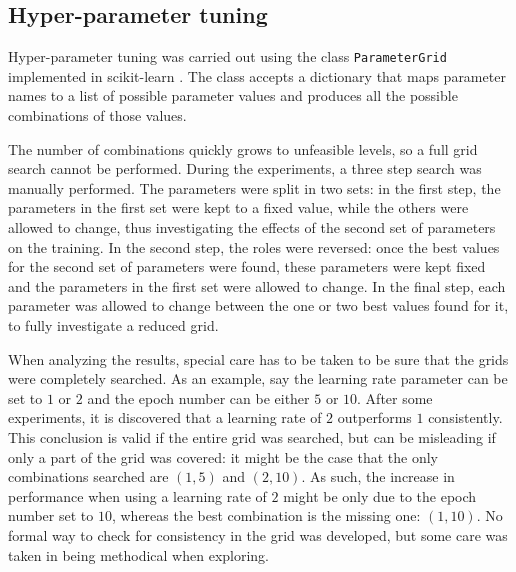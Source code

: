 

\subsection{Hyper-parameter tuning}

Hyper-parameter tuning was carried out using the class \texttt{ParameterGrid}
implemented in scikit-learn \cite{scikit-learn}.
The class accepts a dictionary that maps parameter names to a list of possible
parameter values and produces all the possible combinations of those values.

The number of combinations quickly grows to unfeasible levels, so a full grid
search cannot be performed.
During the experiments, a three step search was manually performed.
The parameters were split in two sets:
in the first step, the parameters in the first set were kept to a fixed value,
while the others were allowed to change, thus investigating the effects of the
second set of parameters on the training.
In the second step, the roles were reversed:
once the best values for the second set of parameters were found, these
parameters were kept fixed and the parameters in the first set were allowed to
change.
In the final step, each parameter was allowed to change between the one or two
best values found for it, to fully investigate a reduced grid.

When analyzing the results, special care has to be taken to be sure that
the grids were completely searched.
As an example, say the learning rate parameter can be set to $1$ or $2$
and the epoch number can be either $5$ or $10$.
After some experiments, it is discovered that a learning rate of $2$
outperforms $1$ consistently.
This conclusion is valid if the entire grid was searched, but can be misleading
if only a part of the grid was covered: it might be the case that the only
combinations searched are $(1, 5)$ and $(2, 10)$.
As such, the increase in performance when using a learning rate of $2$ might be
only due to the epoch number set to $10$, whereas the best combination is the
missing one: $(1, 10)$.
No formal way to check for consistency in the grid was developed,
but some care was taken in being methodical when exploring.

